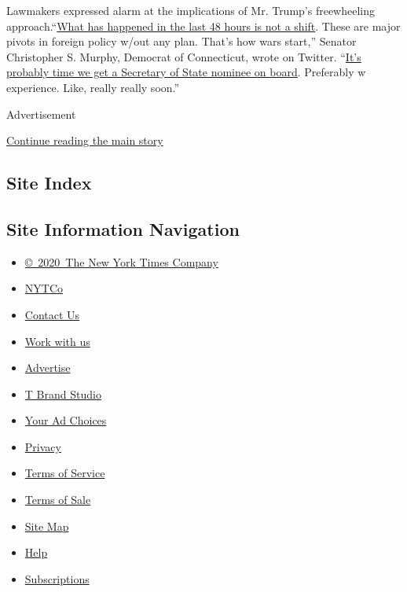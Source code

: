 Lawmakers expressed alarm at the implications of Mr. Trump's
freewheeling
approach.``\href{https://twitter.com/ChrisMurphyCT/status/804809228401672192}{What
has happened in the last 48 hours is not a shift}. These are major
pivots in foreign policy w/out any plan. That's how wars start,''
Senator Christopher S. Murphy, Democrat of Connecticut, wrote on
Twitter.
``\href{https://twitter.com/ChrisMurphyCT/status/804811098205650944}{It's
probably time we get a Secretary of State nominee on board}. Preferably
w experience. Like, really really soon.''

Advertisement

\protect\hyperlink{after-bottom}{Continue reading the main story}

\hypertarget{site-index}{%
\subsection{Site Index}\label{site-index}}

\hypertarget{site-information-navigation}{%
\subsection{Site Information
Navigation}\label{site-information-navigation}}

\begin{itemize}
\tightlist
\item
  \href{https://help.nytimes.com/hc/en-us/articles/115014792127-Copyright-notice}{©~2020~The
  New York Times Company}
\end{itemize}

\begin{itemize}
\tightlist
\item
  \href{https://www.nytco.com/}{NYTCo}
\item
  \href{https://help.nytimes.com/hc/en-us/articles/115015385887-Contact-Us}{Contact
  Us}
\item
  \href{https://www.nytco.com/careers/}{Work with us}
\item
  \href{https://nytmediakit.com/}{Advertise}
\item
  \href{http://www.tbrandstudio.com/}{T Brand Studio}
\item
  \href{https://www.nytimes.com/privacy/cookie-policy\#how-do-i-manage-trackers}{Your
  Ad Choices}
\item
  \href{https://www.nytimes.com/privacy}{Privacy}
\item
  \href{https://help.nytimes.com/hc/en-us/articles/115014893428-Terms-of-service}{Terms
  of Service}
\item
  \href{https://help.nytimes.com/hc/en-us/articles/115014893968-Terms-of-sale}{Terms
  of Sale}
\item
  \href{https://spiderbites.nytimes.com}{Site Map}
\item
  \href{https://help.nytimes.com/hc/en-us}{Help}
\item
  \href{https://www.nytimes.com/subscription?campaignId=37WXW}{Subscriptions}
\end{itemize}
